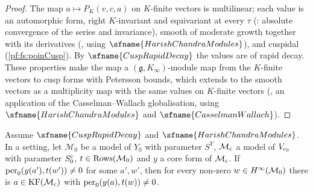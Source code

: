\begin{proof}
The map $a\mapsto P_K(v,c,a)$ on $K$-finite vectors is multilinear; each value is an automorphic form, right $K$-invariant and
equivariant at every $\tau$ (: absolute convergence of the series and
invariance), smooth of moderate growth together with its derivatives
(, using $\sfname{HarishChandraModules}$), and cuspidal
(\cref{pf:fs:poinCusp}). By $\sfname{CuspRapidDecay}$ the values are
of rapid decay. These properties make the map a $(\mathfrak g,K_\infty)$-module map from the $K$-finite vectors to cusp forms with
Petersson bounds, which extends to the smooth vectors as a multiplicity map with the same values on $K$-finite vectors
(, an application of the Casselman--Wallach globalisation, using
$\sfname{HarishChandraModules}$ and $\sfname{CasselmanWallach}$).
\end{proof}

\begin{lemma}\label{pf:fs:kf}\sloppy
Assume $\sfname{CuspRapidDecay}$ and $\sfname{HarishChandraModules}$. In a setting, let $\mathcal M_0$ be a model of $Y_0$ with
parameter $S^Y$, $\mathcal M_{\mathrm{c}}$ a model of $V_{\mathrm{c}_0}$ with parameter $S^{\mathrm{c}}_0$, $t\in\mathrm{Rows}(\mathcal M_0)$ and $y$ a core form
of $\mathcal M_{\mathrm{c}}$. If $\mathrm{per}_0(y(a'),t(w'))\neq0$ for some $a',w'$, then for every non-zero $w\in H^{\infty}(\mathcal M_0)$ there is
$a\in\mathrm{KF}(\mathcal M_{\mathrm{c}})$ with $\mathrm{per}_0(y(a),t(w))\neq0$.
\end{lemma}

